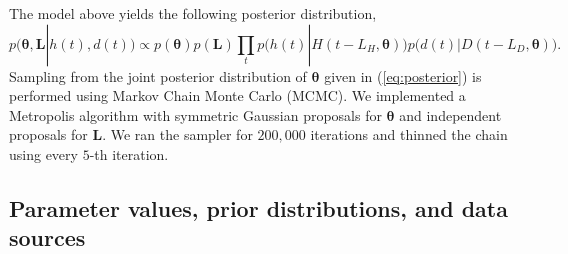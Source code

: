 \documentclass[11pt]{article}
\newcommand{\bL}{\mathbf{L}}
\newcommand{\btheta}{\boldsymbol{\theta}}
\newcommand{\comments}[1]{[\textcolor{red}{#1}]}
\begin{document}


The model above yields the following posterior distribution,
\begin{equation}
p(\btheta, \bL | h(t), d(t)) \propto p(\btheta) p(\bL)
							 \prod_t p\big(h(t)| H(t - L_H, \btheta)\big)
							         p\big(d(t)| D(t - L_D, \btheta)\big).
\label{eq:posterior}
\end{equation}
Sampling from the joint posterior distribution of $\btheta$ given in (\ref{eq:posterior}) is performed using Markov Chain Monte Carlo (MCMC). We implemented a Metropolis algorithm with symmetric Gaussian proposals for $\btheta$ and independent proposals for $\bL$. We ran the sampler for $200,000$ iterations and thinned the chain using every $5$-th iteration.




\subsection{Parameter values, prior distributions, and data sources}
\end{document}
